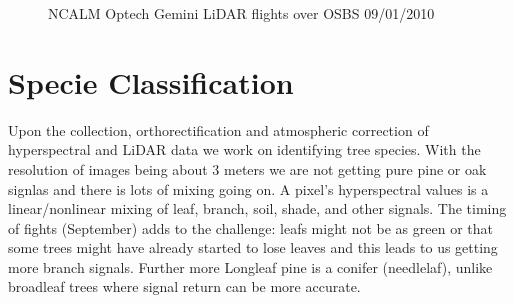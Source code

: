 \documentclass[remotesensing,article,accept,moreauthors,pdftex,12pt,a4paper]{mdpi}
\begin{document}
\begin{figure}[tp]
  \centering
  \hspace{3em}%
   \caption{NCALM Optech Gemini LiDAR flights over OSBS 09/01/2010 \cite{neon2010aopdatarelease}}
 \label{fig:lidar}
\end{figure}



\section{Specie Classification}

Upon the collection, orthorectification and atmospheric correction of hyperspectral and LiDAR data we work on identifying tree species. With the resolution of images being about 3 meters we are not getting pure pine or oak signlas and there is lots of mixing going on. A pixel's hyperspectral values is a linear/nonlinear mixing of leaf, branch, soil, shade, and other signals. The timing of fights (September) adds to the challenge: leafs might not be as green or that some trees might have already started to lose leaves and this leads to us getting more branch signals. Further more Longleaf pine is a conifer (needlelaf), unlike broadleaf trees where signal return can be more accurate. 
\end{document}
